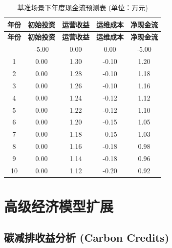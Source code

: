 \begin{longtable}{|c|c|c|c|c|}
    \caption{基准场景下年度现金流预测表 (单位：万元)} \label{tab:cash_flow_detailed}              \\
    \hline
    \textbf{年份} & \textbf{初始投资} & \textbf{运营收益} & \textbf{运维成本} & \textbf{净现金流} \\ \hline
    \endfirsthead
    \hline
    \textbf{年份} & \textbf{初始投资} & \textbf{运营收益} & \textbf{运维成本} & \textbf{净现金流} \\ \hline
    \endhead
    \hline
    \endfoot
    \hline
    \endlastfoot
    0           & -5.00         & 0.00          & 0.00          & -5.00         \\ \hline
    1           & 0.00          & 1.30          & -0.10         & 1.20          \\ \hline
    2           & 0.00          & 1.28          & -0.10         & 1.18          \\ \hline
    3           & 0.00          & 1.26          & -0.10         & 1.16          \\ \hline
    4           & 0.00          & 1.24          & -0.12         & 1.12          \\ \hline
    5           & 0.00          & 1.22          & -0.12         & 1.10          \\ \hline
    6           & 0.00          & 1.20          & -0.15         & 1.05          \\ \hline
    7           & 0.00          & 1.18          & -0.15         & 1.03          \\ \hline
    8           & 0.00          & 1.16          & -0.18         & 0.98          \\ \hline
    9           & 0.00          & 1.14          & -0.18         & 0.96          \\ \hline
    10          & 0.00          & 1.12          & -0.20         & 0.92          \\ \hline
\end{longtable}

\section{高级经济模型扩展}

\subsection{碳减排收益分析 (Carbon Credits)}

